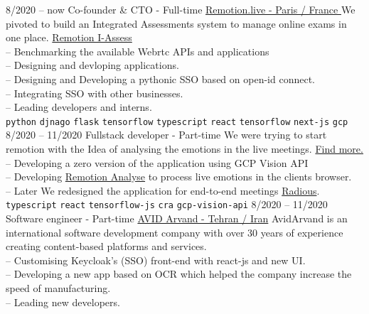 \documentclass[9pt]{developercv}
\begin{document}
\begin{entrylist}
	\entry
	{8/2020 -- now}
	{Co-founder \& CTO - Full-time}
	{\href{https://remotion.live/}{Remotion.live - Paris / France }}
	{We pivoted to build an Integrated Assessments system to manage online exams in one place.
		\href{https://remotion.live/} {Remotion I-Assess} \\
		-- Benchmarking the available Webrtc APIs and applications  \\
		-- Designing and devloping applications. \\
		-- Designing and Developing a pythonic SSO based on open-id connect. \\
		-- Integrating SSO with other businesses. \\
		-- Leading developers and interns. \\
		\texttt{python}\slashsep
		\texttt{djnago}\slashsep
		\texttt{flask}\slashsep
		\texttt{tensorflow}\slashsep
		\texttt{typescript}\slashsep
		\texttt{react}\slashsep
		\texttt{tensorflow}\slashsep
		\texttt{next-js}\slashsep
		\texttt{gcp}\slashsep
	}
	\entry
	{8/2020 -- 11/2020}
	{Fullstack developer - Part-time}
	{}
	{We were trying to start remotion with the Idea of analysing the emotions in the live meetings.
		\href{https://remotion.live/} {Find more.} \\
		-- Developing a zero version of the application using GCP Vision API \\
		-- Developing \href{https://analyse.remotion.live/} {Remotion Analyse} to process live emotions in the clients browser. \\
		-- Later We redesigned the application for end-to-end meetings \href{https://radious.fr/} {Radious}. \\
		\texttt{typescript}\slashsep
		\texttt{react}\slashsep
		\texttt{tensorflow-js}\slashsep
		\texttt{cra}\slashsep
		\texttt{gcp-vision-api}\slashsep
	}
	\entry
	{8/2020 -- 11/2020}
	{Software engineer - Part-time}
	{
		\href{https://www.linkedin.com/company/avid-technology-development/}{AVID Arvand - Tehran / Iran}}
	{
		AvidArvand is an international software development company with over 30 years of experience creating content-based platforms and services. \\
		-- Customising Keycloak's (SSO) front-end with react-js and new UI. \\
		-- Developing a new app based on OCR which helped
		the company increase the speed of manufacturing. \\
		-- Leading new developers. \\
}
\end{entrylist}
\end{document}
